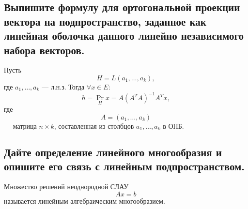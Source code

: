 \begin{center}
\end{center}

\subsection{Выпишите формулу для ортогональной проекции вектора на подпространство, заданное как линейная оболочка данного линейно независимого набора векторов.}

\begin{theorem}
    Пусть
    \[
        H = L(a_1,\ldots,a_k),
    \]
    где $a_1,\ldots,a_k$ --- л.н.з. Тогда $\forall x \in E$:
    \[  h
        =
        \operatorname{Pr}_{H}x
        =
        A(A^TA)^{-1}A^Tx,
    \]
    где
    \[
        A = (a_1,\ldots,a_k)
    \]
    --- матрица $n \times k$, составленная из столбцов $a_1,\ldots,a_k$ в ОНБ.
\end{theorem}

\subsection{Дайте определение линейного многообразия и опишите его связь с линейным подпространством.}
\begin{definition}
    Множество решений неоднородной СЛАУ
    \[
        Ax = b
    \]
    называется линейным алгебраическим многообразием.
\end{definition}

